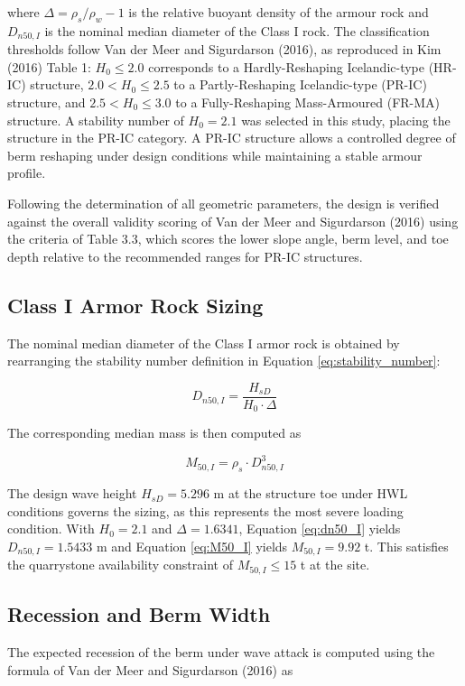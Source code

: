 \documentclass[a4paper, 11pt]{article}
\begin{document}
where $\Delta = \rho_s/\rho_w - 1$ is the relative buoyant density of the armour rock and $D_{n50,I}$ is the nominal median diameter of the Class I rock. The classification thresholds follow Van der Meer and Sigurdarson (2016), as reproduced in Kim (2016) Table 1: $H_0 \leq 2.0$ corresponds to a Hardly-Reshaping Icelandic-type (HR-IC) structure, $2.0 < H_0 \leq 2.5$ to a Partly-Reshaping Icelandic-type (PR-IC) structure, and $2.5 < H_0 \leq 3.0$ to a Fully-Reshaping Mass-Armoured (FR-MA) structure. A stability number of $H_0 = 2.1$ was selected in this study, placing the structure in the PR-IC category. A PR-IC structure allows a controlled degree of berm reshaping under design conditions while maintaining a stable armour profile.

Following the determination of all geometric parameters, the design is verified against the overall validity scoring of Van der Meer and Sigurdarson (2016) using the criteria of Table 3.3, which scores the lower slope angle, berm level, and toe depth relative to the recommended ranges for PR-IC structures.

\subsection{Class I Armor Rock Sizing}
\hspace{0.5cm}The nominal median diameter of the Class I armor rock is obtained by rearranging the stability number definition in Equation \ref{eq:stability_number}:

\begin{equation}
    D_{n50,I} = \frac{H_{sD}}{H_0 \cdot \Delta}
    \label{eq:dn50_I}
\end{equation}

The corresponding median mass is then computed as

\begin{equation}
    M_{50,I} = \rho_s \cdot D_{n50,I}^3
    \label{eq:M50_I}
\end{equation}

The design wave height $H_{sD} = 5.296$ m at the structure toe under HWL conditions governs the sizing, as this represents the most severe loading condition. With $H_0 = 2.1$ and $\Delta = 1.6341$, Equation \ref{eq:dn50_I} yields $D_{n50,I} = 1.5433$ m and Equation \ref{eq:M50_I} yields $M_{50,I} = 9.92$ t. This satisfies the quarrystone availability constraint of $M_{50,I} \leq 15$ t at the site.

\subsection{Recession and Berm Width}
\hspace{0.5cm}The expected recession of the berm under wave attack is computed using the formula of Van der Meer and Sigurdarson (2016) as
\end{document}
